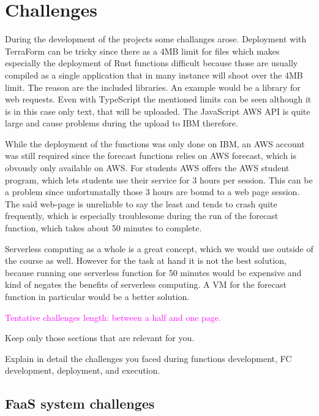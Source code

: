 \chapter{\label{chap:challenges}Challenges}

During the development of the projects some challanges arose. Deployment with
TerraForm can be tricky since there as a 4MB limit for files which makes
especially the deployment of Rust functions difficult because those are usually
compiled as a single application that in many instance will shoot over the 4MB
limit. The reason are the included libraries. An example would be a library for
web requests. Even with TypeScript the mentioned limits can be seen although it
is in this case only text, that will be uploaded. The JavaScript AWS API is
quite large and cause problems during the upload to IBM therefore.

While the deployment of the functions was only done on IBM, an AWS account was
still required since the forecast functions relies on AWS forecast, which is
obvously only available on AWS. For students AWS offers the AWS student
program, which lets students use their service for 3 hours per session. This
can be a problem since unfortunatally those 3 hours are bound to a web page
session.  The said web-page is unreliable to say the least and tends to crash
quite frequently, which is especially troublesome during the run of the
forecast function, which takes about 50 minutes to complete.

Serverless computing as a whole is a great concept, which we would use outside
of the course as well. However for the task at hand it is not the best solution,
because running one serverless function for 50 minutes would be expensive and
kind of negates the benefits of serverless computing. A VM for the forecast function
in particular would be a better solution.



\textcolor{magenta}{Tentative challenges length: between a half and one page.}

\vspace{20 pt}

Keep only those sections that are relevant for you.

\vspace{20 pt}

Explain in detail the challenges you faced during functions development, FC development, deployment, and execution.


%
%
%
\section{FaaS system challenges}

